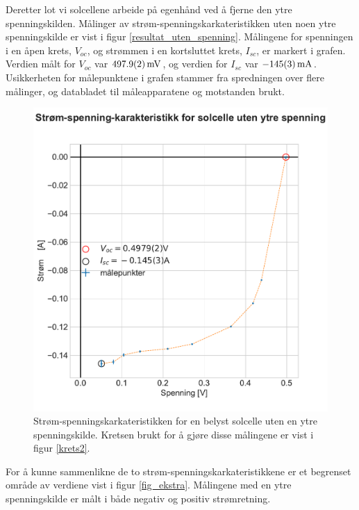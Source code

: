 \documentclass[%
 reprint,
 amsmath,amssymb,
 aps,
 norsk,
 booktabs
]{revtex4-1}
\begin{document}
Deretter lot vi solcellene arbeide på egenhånd ved å fjerne den ytre spenningskilden. Målinger av strøm-spenningskarkateristikken uten noen ytre spenningskilde er vist i figur \vref{resultat_uten_spenning}. Målingene for spenningen i en åpen krets, $V_{oc}$, og strømmen i en kortsluttet krets, $I_{sc}$, er markert i grafen. Verdien målt for $V_{oc}$ var $\SI{497.9\pm0.2}{\milli\volt}$, og verdien for $I_{sc}$ var $\SI{-145\pm3}{\milli\ampere}$. Usikkerheten for målepunktene i grafen stammer fra spredningen over flere målinger, og databladet til måleapparatene og motstanden brukt. \\
\begin{figure}
  \centering
  \includegraphics[scale=0.47]{strom_spenning_karr.pdf}
  \caption{Strøm-spenningskarkateristikken for en belyst solcelle uten en ytre spenningskilde. Kretsen brukt for å gjøre disse målingene er vist i figur \vref{krets2}.}
  \label{resultat_uten_spenning}
\end{figure}
For å kunne sammenlikne de to strøm-spenningskarkateristikkene er et begrenset område av verdiene vist i figur \vref{fig_ekstra}. Målingene med en ytre spenningskilde er målt i både negativ og positiv strømretning.
\end{document}
